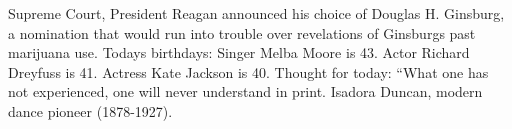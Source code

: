 \documentclass{article}
\begin{document}
Supreme Court, President Reagan announced his choice of \color[rgb]{0.27058823529411763,0.592156862745098,0.10980392156862745}Douglas H. Ginsburg, a nomination that would run into \color[rgb]{0.3215686274509804,0.00784313725490196,0.6549019607843137}trouble over revelations of Ginsburgs past marijuana use. \color[rgb]{0.27058823529411763,0.592156862745098,0.10980392156862745}Todays birthdays: Singer Melba Moore is 43. Actor Richard Dreyfuss is 41. Actress Kate \color[rgb]{0.9764705882352941,0.12941176470588237,0.24313725490196078}Jackson is 40. \color[rgb]{0.27058823529411763,0.592156862745098,0.10980392156862745}Thought for today: ``What one has not experienced, one will never understand in print.  Isadora Duncan, modern dance pioneer (1878-1927). 
\end{document}
